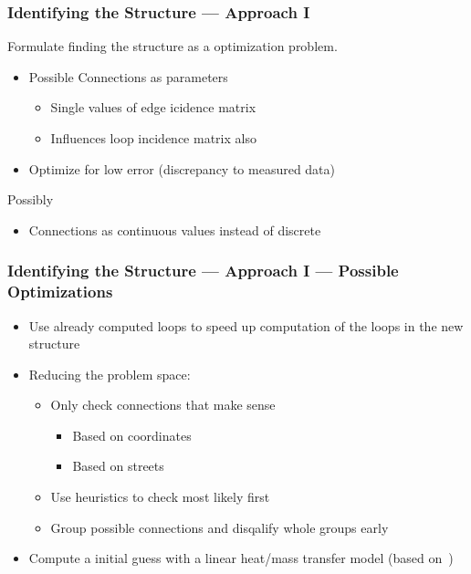 \documentclass{beamer}
\begin{document}
\begin{frame}
\frametitle{Identifying the Structure --- Approach I}
  Formulate finding the structure as a optimization problem.

  \vspace{2em}

  \begin{itemize}
    \item Possible Connections as parameters
      \begin{itemize}
        \item Single values of edge icidence matrix
        \item Influences loop incidence matrix also
      \end{itemize}
    \item Optimize for low error (discrepancy to measured data)
  \end{itemize}

  \vspace{2em}

  Possibly
  \begin{itemize}
    \item Connections as continuous values instead of discrete
  \end{itemize}
\end{frame}

\begin{frame}
\frametitle{Identifying the Structure --- Approach I --- Possible Optimizations}
  \begin{itemize}
    \item Use already computed loops to speed up computation of the loops in the new structure
    \item Reducing the problem space:
    \begin{itemize}
      \item Only check connections that make sense
        \begin{itemize}
          \item Based on coordinates
          \item Based on streets
        \end{itemize}
      \item Use heuristics to check most likely first
      \item Group possible connections and disqalify whole groups early
    \end{itemize}
    \item Compute a initial guess with a linear heat/mass transfer model (based on~\cite{wang2024identification})
  \end{itemize}
\end{frame}
\end{document}
